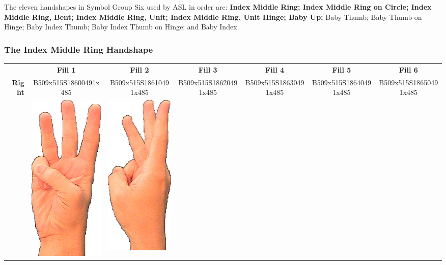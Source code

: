 \documentclass{article}
\begin{document}
The eleven handshapes in Symbol Group Six used by ASL in order are:
{\bf
Index Middle Ring;
Index Middle Ring on Circle;
Index Middle Ring, Bent;
Index Middle Ring, Unit;
Index Middle Ring, Unit Hinge;
Baby Up;
}
Baby Thumb;
Baby Thumb on Hinge;
Baby Index Thumb;
Baby Index Thumb on Hinge;
and Baby Index.

\subsubsection{The Index Middle Ring Handshape}

\begin{center}
\begin{tabular}{r*{6}{c}}
&\textbf{Fill 1}&\textbf{Fill 2}&\textbf{Fill 3}&\textbf{Fill 4}&\textbf{Fill 5}&\textbf{Fill 6}\\
\multirow{2}{*}{\textbf{Right}}&
B509x515S18600491x485&
B509x515S18610491x485&
B509x515S18620491x485&
B509x515S18630491x485&
B509x515S18640491x485&
B509x515S18650491x485\\
&
\includegraphics[scale=0.1]{images/06-01-1.jpg}&
\includegraphics[scale=0.1]{images/06-01-2.jpg}&

\end{tabular}
\end{center}
\end{document}
